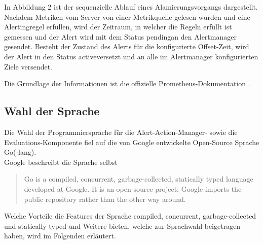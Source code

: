 \documentclass[a4paper,10pt]{scrartcl}
\begin{document}
In Abbildung 2 ist der sequenzielle Ablauf eines Alamierungsvorgangs dargestellt. Nachdem Metriken vom Server von einer Metrikquelle gelesen wurden und eine Alertingregel erfüllen, wird der Zeitraum, in welcher die Regeln erfüllt ist gemessen und der Alert wird mit dem Status \glqq pending\grqq an den Alertmanager gesendet. Besteht der Zustand des Alerts für die konfigurierte Offset-Zeit, wird der Alert in den Status \grqq active\grqq versetzt und an alle im Alertmanager konfigurierten Ziele versendet.

Die Grundlage der Informationen ist die offizielle Prometheus-Dokumentation \cite{Prometheus.06.07.2020}.

\subsection{Wahl der Sprache}

Die Wahl der Programmiersprache für die \glqq Alert-Action-Manager\grqq- sowie die Evaluations-Komponente fiel auf die von Google entwickelte Open-Source Sprache Go(-lang).\\
Google beschreibt die Sprache selbst
\begin{quote}Go is a compiled, concurrent, garbage-collected, statically typed language developed at Google. It is an open source project: Google imports the public repository rather than the other way around.~\cite{Tien.2019}\end{quote}
Welche Vorteile die Features der Sprache compiled, concurrent, garbage-collected und statically typed und Weitere bieten, welche zur Sprachwahl beigetragen haben, wird im Folgenden erläutert.
\end{document}
